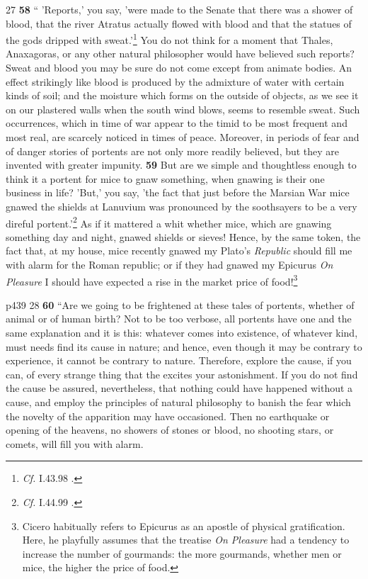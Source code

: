 27
\textbf{58} `` 'Reports,' you say, 'were made to the Senate that there was a shower of blood, that the river Atratus actually flowed with blood and that the statues of the gods dripped with sweat.'\texthebrew{}\footnote{\emph{Cf.}
I.43.98 .

} You do not think for a moment that Thales, Anaxagoras, or any other natural philosopher would have believed such reports? Sweat and blood you may be sure do not come except from animate bodies. An effect strikingly like blood is produced by the admixture of water with certain kinds of soil; and the moisture which forms on the outside of objects, as we see it on our plastered walls when the south wind blows, seems to resemble sweat. Such occurrences, which in time of war appear to the timid to be most frequent and most real, are scarcely noticed in times of peace. Moreover, in periods of fear and of danger stories of portents are not only more readily believed, but they are invented with greater impunity. \textbf{59} But are we simple and thoughtless enough to think it a portent for mice to gnaw something, when gnawing is their one business in life? 'But,' you say, 'the fact that just before the Marsian War mice gnawed the shields at Lanuvium was pronounced by the soothsayers to be a very direful portent.'\texthebrew{}\footnote{\emph{Cf.}
I.44.99 .

} As if it mattered a whit whether mice, which are gnawing something day and night, gnawed shields or sieves! Hence, by the same token, the fact that, at my house, mice recently gnawed my Plato's \emph{Republic} should fill me with alarm for the Roman republic; or if they had gnawed my Epicurus \emph{On Pleasure} I should have expected a rise in the market price of food!\footnote{Cicero habitually refers to Epicurus as an apostle of physical gratification. Here, he playfully assumes that the treatise \emph{On Pleasure} had a tendency to increase the number of gourmands: the more gourmands, whether men or mice, the higher the price of food.

}

p439
28
\textbf{60} ``Are we going to be frightened at these tales of portents, whether of animal or of human birth? Not to be too verbose, all portents have one and the same explanation and it is this: whatever comes into existence, of whatever kind, must needs find its cause in nature; and hence, even though it may be contrary to experience, it cannot be contrary to nature. Therefore, explore the cause, if you can, of every strange thing that the excites your astonishment. If you do not find the cause be assured, nevertheless, that nothing could have happened without a cause, and employ the principles of natural philosophy to banish the fear which the novelty of the apparition may have occasioned. Then no earthquake or opening of the heavens, no showers of stones or blood, no shooting stars, or comets, will fill you with alarm.

